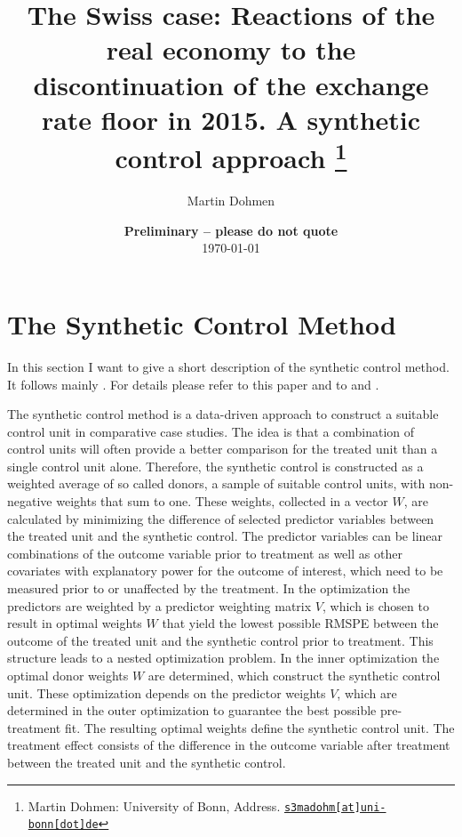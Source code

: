 \documentclass[10pt, a4paper]{article}
\begin{document}
\title{The Swiss case: Reactions of the real economy to the discontinuation of the exchange rate floor in 2015. A synthetic control approach
\thanks{Martin Dohmen: University of Bonn, Address. \href{mailto:x@y.z} {\nolinkurl{s3madohm[at]uni-bonn[dot]de}}}
}

\author{Martin Dohmen
}

\date{
{\bf Preliminary -- please do not quote} 
\\[1ex] 
\today
}

\maketitle



\clearpage


\section{The Synthetic Control Method} %
\label{sec:method} 

In this section I want to give a short description of the synthetic control method. It follows mainly \citet{Abadie2010}. For details please refer to this paper and to \citet{Abadie2014} and \citet{Becker2018}.

The synthetic control method is a data-driven approach to construct a suitable control unit in comparative case studies. The idea is that a combination of control units will often provide a better comparison for the treated unit than a single control unit alone. Therefore, the synthetic control is constructed as a weighted average of so called donors, a sample of suitable control units, with non-negative weights that sum to one. These weights, collected in a vector $W$, are calculated by minimizing the difference of selected predictor variables between the treated unit and the synthetic control. The predictor variables can be linear combinations of the outcome variable prior to treatment as well as other covariates with explanatory power for the outcome of interest, which need to be measured prior to or unaffected by the treatment. In the optimization the predictors are weighted by a predictor weighting matrix $V$, which is chosen to result in optimal weights $W$ that yield the lowest possible RMSPE between the outcome of the treated unit and the synthetic control prior to treatment. This structure leads to a nested optimization problem. In the inner optimization the optimal donor weights $W$ are determined, which construct the synthetic control unit. These optimization depends on the predictor weights $V$, which are determined in the outer optimization to guarantee the best possible pre-treatment fit. The resulting optimal weights define the synthetic control unit. The treatment effect consists of the difference in the outcome variable after treatment between the treated unit and the synthetic control.
\end{document}
